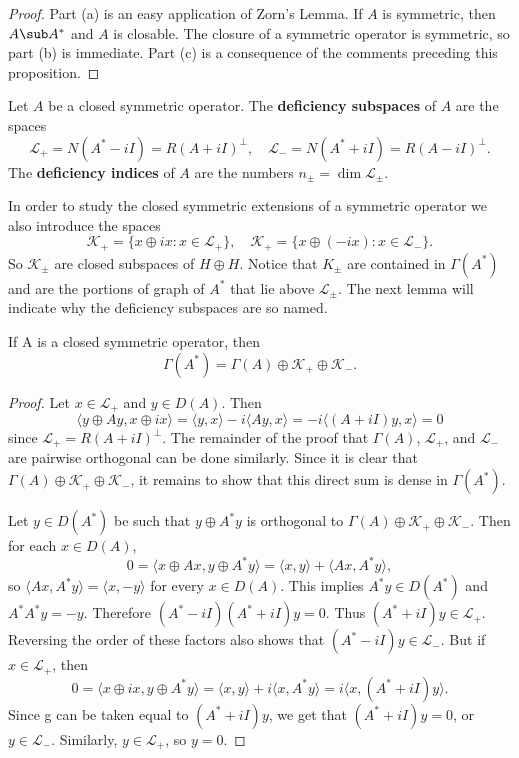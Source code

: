 \begin{proof}
Part (a) is an easy application of Zorn's Lemma. If $A$ is symmetric, then $A\sub A^*$ and $A$ is closable. The closure of a symmetric operator is symmetric, so part (b) is immediate. Part (c) is a consequence of the comments preceding this proposition.
\end{proof}
\begin{definition}
Let $A$ be a closed symmetric operator. The \textbf{deficiency subspaces} of $A$ are the spaces
\[\mathscr{L}_{+}=N(A^*-iI)=R(A+iI)^\bot,\quad\mathscr{L}_{-}=N(A^*+iI)=R(A-iI)^\bot.\]
The \textbf{deficiency indices} of $A$ are the numbers $n_{\pm}=\dim\mathscr{L}_{\pm}$.
\end{definition}
In order to study the closed symmetric extensions of a symmetric operator we also introduce the spaces
\[\mathscr{K}_+=\{x\oplus ix:x\in\mathscr{L}_+\},\quad \mathscr{K}_+=\{x\oplus(-ix):x\in\mathscr{L}_-\}.\]
So $\mathscr{K}_{\pm}$ are closed subspaces of $H\oplus H$. Notice that $K_{\pm}$ are contained in $\Gamma(A^*)$ and are the portions of graph of $A^*$ that lie above $\mathscr{L}_{\pm}$. The next lemma will indicate why the deficiency subspaces are so named.
\begin{lemma}\label{Hilbert space closed symmetric graph of dual}
If A is a closed symmetric operator, then
\[\Gamma(A^*)=\Gamma(A)\oplus\mathscr{K}_+\oplus\mathscr{K}_-.\]
\end{lemma}
\begin{proof}
Let $x\in\mathscr{L}_+$ and $y\in D(A)$. Then
\[\langle y\oplus Ay,x\oplus ix\rangle=\langle y,x\rangle-i\langle Ay,x\rangle=-i\langle(A+iI)y,x\rangle=0\]
since $\mathscr{L}_+=R(A+iI)^\bot$. The remainder of the proof that $\Gamma(A)$, $\mathscr{L}_+$, and $\mathscr{L}_-$ are pairwise orthogonal can be done similarly. Since it is clear that $\Gamma(A)\oplus\mathscr{K}_+\oplus\mathscr{K}_-$, it remains to show that this direct sum is dense in $\Gamma(A^*)$.\par
Let $y\in D(A^*)$ be such that $y\oplus A^*y$ is orthogonal to $\Gamma(A)\oplus\mathscr{K}_+\oplus\mathscr{K}_-$. Then for each $x\in D(A)$,
\[0=\langle x\oplus Ax,y\oplus A^*y\rangle=\langle x,y\rangle+\langle Ax,A^*y\rangle,\]
so $\langle Ax,A^*y\rangle=\langle x,-y\rangle$ for every $x\in D(A)$. This implies $A^*y\in D(A^*)$ and $A^*A^*y=-y$. Therefore $(A^*-iI)(A^*+iI)y=0$. Thus $(A^*+iI)y\in\mathscr{L}_+$. Reversing the order of these factors also shows that $(A^*-iI)y\in\mathscr{L}_-$. But if $x\in\mathscr{L}_+$, then
\[0=\langle x\oplus ix,y\oplus A^*y\rangle=\langle x,y\rangle+i\langle x,A^*y\rangle=i\langle x,(A^*+iI)y\rangle.\]
Since g can be taken equal to $(A^*+iI)y$, we get that $(A^*+iI)y=0$, or $y\in\mathscr{L}_-$. Similarly, $y\in\mathscr{L}_+$, so $y=0$.
\end{proof}
